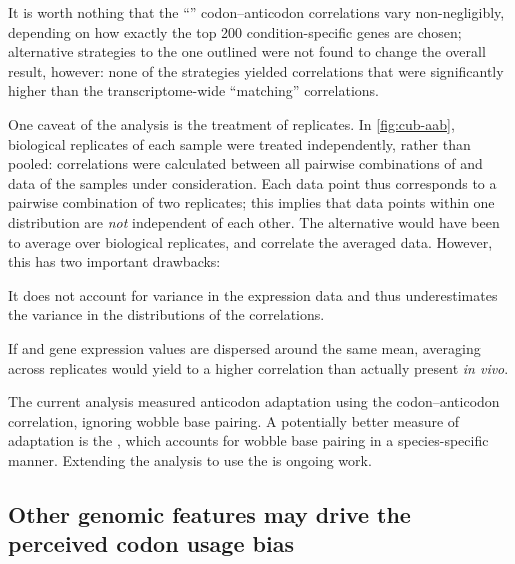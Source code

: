 It is worth nothing that the “” codon--anticodon correlations vary
non-negligibly, depending on how exactly the top \num{200} condition-specific
genes are chosen; alternative strategies to the one outlined were not found to
change the overall result, however: none of the strategies yielded correlations
that were significantly higher than the transcriptome-wide “matching”
correlations.

One caveat of the analysis is the treatment of replicates. In
\cref{fig:cub-aab}, biological replicates of each sample were treated
independently, rather than pooled: correlations were calculated between all
pairwise combinations of \rnaseq and  \chipseq data of the samples under
consideration. Each data point thus corresponds to a pairwise combination of two
replicates; this implies that data points within one distribution are \emph{not}
independent of each other. The alternative would have been to average over
biological replicates, and correlate the averaged data. However, this has two
important drawbacks:
\begin{enumerate*}
    \item It does not account for variance in the expression data and thus
        underestimates the variance in the distributions of the correlations.
    \item If \mrna and \trna gene expression values are dispersed around the
        same mean, averaging across replicates would yield to a higher
        correlation than actually present \textit{in vivo}.
\end{enumerate*}

The current analysis measured \trna anticodon adaptation using the
codon--anticodon correlation, ignoring wobble base pairing. A potentially better
measure of \trna adaptation is the \tai, which accounts for wobble base pairing
in a species-specific manner. Extending the analysis to use the \tai is ongoing
work.

\subsection{Other genomic features may drive the perceived codon usage bias}

